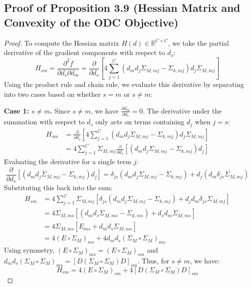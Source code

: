 \documentclass{article}
\theoremstyle{plain}
\theoremstyle{definition}
\theoremstyle{remark}
\begin{document}
\subsection{Proof of Proposition 3.9 (Hessian Matrix and Convexity of the ODC Objective)}
\label{sec:proofs_odc_hessian}
\begin{proof}
To compute the Hessian matrix $H(d) \in \mathbb{R}^{C \times C}$, we take the partial derivative of the gradient components with respect to $d_s$:
\begin{equation*}
  H_{sm} = \frac{\partial^2 f}{\partial d_s \partial d_m} = \frac{\partial}{\partial d_s} \left[ 4 \sum_{j=1}^C \left( d_m d_j \Sigma_{M,mj} - \Sigma_{k,mj} \right) d_j \Sigma_{M,mj} \right]
\end{equation*}
Using the product rule and chain rule, we evaluate this derivative by separating into two cases based on whether $s = m$ or $s \neq m$:

\textbf{Case 1: $s \neq m$.}
Since $s \neq m$, we have $\frac{\partial d_m}{\partial d_s} = 0$. The derivative under the summation with respect to $d_s$ only acts on terms containing $d_j$ when $j = s$:
\begin{align*}
  H_{sm} &= \frac{\partial}{\partial d_s} \left[ 4 \sum_{j=1}^C \left( d_m d_j \Sigma_{M,mj} - \Sigma_{k,mj} \right) d_j \Sigma_{M,mj} \right] \\
  &= 4 \sum_{j=1}^C \Sigma_{M,mj} \frac{\partial}{\partial d_s} \left[ \left( d_m d_j \Sigma_{M,mj} - \Sigma_{k,mj} \right) d_j \right]
\end{align*}
Evaluating the derivative for a single term $j$:
\begin{equation*}
  \frac{\partial}{\partial d_s} \left[ \left( d_m d_j \Sigma_{M,mj} - \Sigma_{k,mj} \right) d_j \right] = \delta_{js} \left( d_m d_j \Sigma_{M,mj} - \Sigma_{k,mj} \right) + d_j \left( d_m \delta_{js} \Sigma_{M,mj} \right)
\end{equation*}
Substituting this back into the sum:
\begin{align*}
  H_{sm} &= 4 \sum_{j=1}^C \Sigma_{M,mj} \left[ \delta_{js} \left( d_m d_j \Sigma_{M,mj} - \Sigma_{k,mj} \right) + d_j d_m \delta_{js} \Sigma_{M,mj} \right] \\
  &= 4 \Sigma_{M,ms} \left[ \left( d_m d_s \Sigma_{M,ms} - \Sigma_{k,ms} \right) + d_s d_m \Sigma_{M,ms} \right] \\
  &= 4 \Sigma_{M,ms} \left[ E_{ms} + d_m d_s \Sigma_{M,ms} \right] \\
  &= 4 (E \circ \Sigma_M)_{ms} + 4 d_m d_s (\Sigma_M \circ \Sigma_M)_{ms}
\end{align*}
Using symmetry, $(E \circ \Sigma_M)_{ms} = (E \circ \Sigma_M)_{sm}$ and $d_m d_s (\Sigma_M \circ \Sigma_M)_{ms} = [D (\Sigma_M \circ \Sigma_M) D]_{sm}$. Thus, for $s \neq m$, we have:
\begin{equation*}
  H_{sm} = 4 (E \circ \Sigma_M)_{sm} + 4 [D (\Sigma_M \circ \Sigma_M) D]_{sm}
\end{equation*}


\end{proof}
\end{document}
